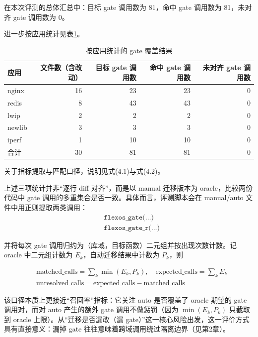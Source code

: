 \documentclass[UTF8,a4paper,12pt]{ctexart}
\numberwithin{equation}{section}
\begin{document}
在本次评测的总体汇总中：目标 gate 调用数为 81，命中 gate 调用数为
81，未对齐 gate 调用数为 0。

进一步按应用统计见表\ref{tab:gate-coverage-by-app}。
{\small
\setlength{\tabcolsep}{4pt}
\begin{longtable}{@{}lrrrr@{}}
\caption{按应用统计的 gate 覆盖结果}\label{tab:gate-coverage-by-app}\\
\toprule
应用 & 文件数（含改动） & 目标 gate 调用数 & 命中 gate 调用数 & 未对齐
gate 调用数 \\
\midrule
\endhead
\bottomrule
\endlastfoot
nginx & 16 & 23 & 23 & 0 \\
redis & 8 & 43 & 43 & 0 \\
lwip & 2 & 2 & 2 & 0 \\
newlib & 3 & 3 & 3 & 0 \\
iperf & 1 & 10 & 10 & 0 \\
合计 & 30 & 81 & 81 & 0 \\
\end{longtable}
}

关于指标提取与匹配口径，说明见式(4.1)与式(4.2)。

上述三项统计并非``逐行 diff 对齐''，而是以 manual 迁移版本为
oracle，比较两份代码中 gate
调用的多重集合是否一致。具体而言，评测脚本会在 manual/auto
文件中用正则提取两类调用：
\begin{equation}
\begin{aligned}
&\texttt{flexos\_gate(\ldots)} \\
&\texttt{flexos\_gate\_r(\ldots)}
\end{aligned}
\end{equation}

并将每次 gate 调用归约为（库域，目标函数）二元组并按出现次数计数。记
oracle 中二元组计数为 \(E_k\)，自动迁移结果中计数为 \(P_k\)，则


\begin{equation}
\begin{aligned}
&\text{matched\_calls}=\sum_k \min(E_k, P_k),\quad
\text{expected\_calls}=\sum_k E_k \\
&\text{unresolved\_calls}=\text{expected\_calls}-\text{matched\_calls}
\end{aligned}
\end{equation}


该口径本质上更接近``召回率''指标：它关注 auto 是否覆盖了 oracle 期望的
gate 调用对，而对 auto 产生的额外 gate 调用不做惩罚（因为
\(\min(E_k,P_k)\) 只截取到 oracle 上限）。从``迁移是否漏改（漏
gate）''这一核心风险出发，这一评价方式具有直接意义：漏掉 gate
往往意味着跨域调用绕过隔离边界（见第2章）。
\end{document}
